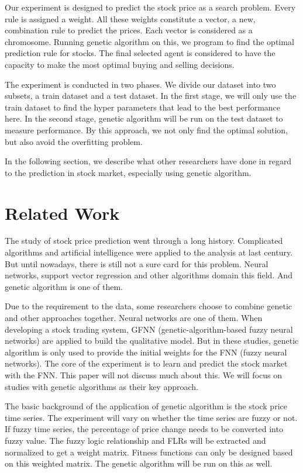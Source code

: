 \documentclass{article}
\begin{document}
Our experiment is designed to predict the stock price as a search problem.
Every rule is assigned a weight.
All these weights constitute a vector, a new, combination rule to predict the prices.
Each vector is considered as a chromosome.
Running genetic algorithm on this, we program to find the optimal prediction rule for stocks.
The final selected agent is considered to have the capacity to make the most optimal buying and selling decisions.

The experiment is conducted in two phases.
We divide our dataset into two subsets, a train dataset and a test dataset.
In the first stage, we will only use the train dataset to find the hyper parameters that lead to the best performance here.
In the second stage, genetic algorithm will be run on the test dataset to measure performance.
By this approach, we not only find the optimal solution, but also avoid the overfitting problem.

In the following section, we describe what other researchers have done in regard to the prediction in stock market, especially using genetic algorithm.

\section{Related Work}

The study of stock price prediction went through a long history.
Complicated algorithms and artificial intelligence were applied to the analysis at last century. \cite{mizuno1998application}
But until nowadays, there is still not a sure card for this problem.
Neural networks, support vector regression and other algorithms domain this field. \cite{schumaker2009textual}
And genetic algorithm is one of them.

Due to the requirement to the data, some researchers choose to combine genetic and other approaches together.
Neural networks are one of them.
When developing a stock trading system, GFNN (genetic-algorithm-based fuzzy neural networks) are applied to build the qualitative model.
But in these studies, genetic algorithm is only used to provide the initial weights for the FNN (fuzzy neural networks). \cite{kuo2001intelligent}
The core of the experiment is to learn and predict the stock market with the FNN.
This paper will not discuss much about this.
We will focus on studies with genetic algorithms as their key approach.

The basic background of the application of genetic algorithm is the stock price time series.
The experiment will vary on whether the time series are fuzzy or not.
If fuzzy time series, the percentage of price change needs to be converted into fuzzy value.
The fuzzy logic relationship and FLRs will be extracted and normalized to get a weight matrix. \cite{cai2013novel}
Fitness functions can only be designed based on this weighted matrix.
The genetic algorithm will be run on this as well.
\end{document}
